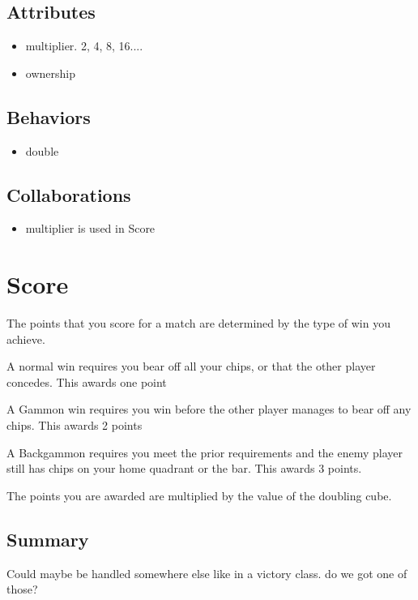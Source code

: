 \documentclass{report}
\begin{document}
\subsection{Attributes}
\begin{itemize}
\item multiplier. 2, 4, 8, 16....
\item ownership
\end{itemize}

\subsection{Behaviors}
\begin{itemize}
\item double
\end{itemize}

\subsection{Collaborations}
\begin{itemize}
\item multiplier is used in Score
\end{itemize}

\section{Score}
\begin{dashed}
\item The points that you score for a match are determined by the type of win you achieve.
\item A normal win requires you bear off all your chips, or that the other player concedes. This awards one point
\item A Gammon win requires you win before the other player manages to bear off any chips. This awards 2 points
\item A Backgammon requires you meet the prior requirements and the enemy player still has chips on your home quadrant or the bar. This awards 3 points.
\item The points you are awarded are multiplied by the value of the doubling cube.
\end{dashed}

\subsection{Summary}
Could maybe be handled somewhere else like in a victory class. do we got one of those?
\end{document}
